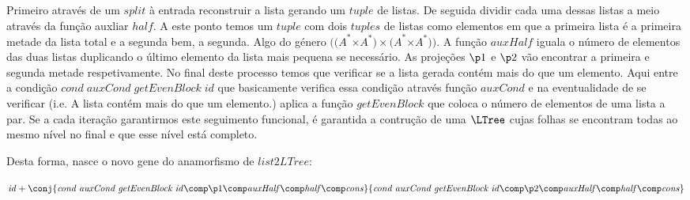 \documentclass[a4paper]{article}
\newcommand{\Conid}[1]{\mathit{#1}}
\newcommand{\Varid}[1]{\mathit{#1}}
\begin{document}
Primeiro através de um $split$ à entrada reconstruir a lista gerando um $tuple$ de listas. De seguida dividir cada uma
dessas listas a meio através da função auxliar $\ensuremath{\Varid{half}}$. A este ponto temos um $tuple$ com dois $tuples$ de listas
como elementos em que a primeira lista é a primeira metade da lista total e a segunda bem, a segunda. Algo do género
$\ensuremath{((\Conid{A}}^*\ensuremath{\times\Conid{A}}^*\ensuremath{)\times(\Conid{A}}^*\ensuremath{\times\Conid{A}}^*\ensuremath{))}$. A função $\ensuremath{\Varid{auxHalf}}$ iguala o número de elementos das duas listas duplicando
o último elemento da lista mais pequena se necessário. As projeções $\ensuremath{\p1}$ e $\ensuremath{\p2}$ vão encontrar a primeira e segunda
metade respetivamente. No final deste processo temos que verificar se a lista gerada contém mais do que um elemento.
Aqui entre a condição $\ensuremath{\Varid{cond}\;\Varid{auxCond}\;\Varid{getEvenBlock}\;\Varid{id}}$ que basicamente verifica essa condição através função $auxCond$
e na eventualidade de se verificar (i.e. A lista contém mais do que um elemento.) aplica a função $\ensuremath{\Varid{getEvenBlock}}$
que coloca o número de elementos de uma lista a par. Se a cada iteração garantirmos este seguimento funcional, é
garantida a contrução de uma $\ensuremath{{\LTree}}$ cujas folhas se encontram todas ao mesmo nível no final e que esse nível está
completo.

Desta forma, nasce o novo gene do anamorfismo de $\ensuremath{\Varid{list2LTree}}$:

$\ensuremath{\Varid{id}\mathbin{+}\conj{\Varid{cond}\;\Varid{auxCond}\;\Varid{getEvenBlock}\;\Varid{id}\comp \p1\comp \Varid{auxHalf}\comp \Varid{half}\comp \Varid{cons}}{\Varid{cond}\;\Varid{auxCond}\;\Varid{getEvenBlock}\;\Varid{id}\comp \p2\comp \Varid{auxHalf}\comp \Varid{half}\comp \Varid{cons}}}$
\end{document}
